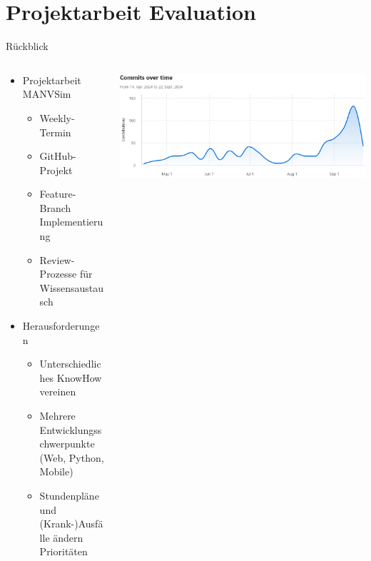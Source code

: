\section{Projektarbeit Evaluation}

\begin{frame}{Rückblick}
	\begin{columns}
		\begin{column}{0.5\textwidth}
			\begin{itemize}
			\itemsep 12pt
			\item[] Projektarbeit MANVSim 
			\begin{itemize}
				\itemsep 4pt
				\item Weekly-Termin
				\item GitHub-Projekt
				\item Feature-Branch Implementierung
				\item Review-Prozesse für Wissensaustausch
			\end{itemize}
			\item[] Herausforderungen
			\begin{itemize}
				\itemsep 4pt
				\item Unterschiedliches KnowHow vereinen
				\item Mehrere Entwicklungsschwerpunkte (Web, Python, Mobile)
				\item Stundenpläne und (Krank-)Ausfälle ändern Prioritäten
			\end{itemize}
			\end{itemize}
		\end{column}
		\begin{column}{0.5\textwidth}
			\centering
			\includegraphics[height=0.4\textheight]{images/Commits_over_time.png}
		\end{column}
	\end{columns}
\end{frame}


